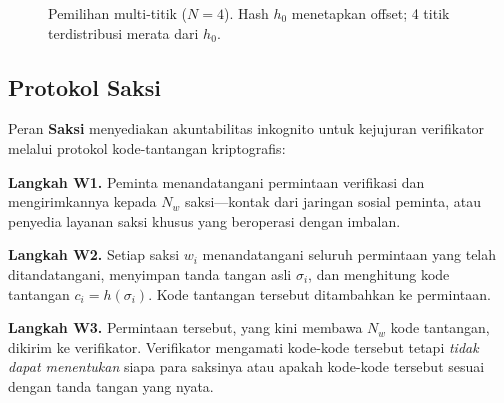 \documentclass[11pt,a4paper,twocolumn]{article}
\begin{document}
\begin{figure}[ht]
\centering
{}
\caption{Pemilihan multi-titik ($N{=}4$). Hash $h_0$ menetapkan offset; 4 titik terdistribusi merata dari $h_0$.}
\label{fig:multipoint}
\end{figure}

\subsection{Protokol Saksi}

Peran \textbf{Saksi} menyediakan akuntabilitas inkognito untuk kejujuran verifikator melalui protokol kode-tantangan kriptografis:

\textbf{Langkah W1.} Peminta menandatangani permintaan verifikasi dan mengirimkannya kepada $N_w$ saksi---kontak dari jaringan sosial peminta, atau penyedia layanan saksi khusus yang beroperasi dengan imbalan.

\textbf{Langkah W2.} Setiap saksi $w_i$ menandatangani seluruh permintaan yang telah ditandatangani, menyimpan tanda tangan asli $\sigma_i$, dan menghitung kode tantangan $c_i = h(\sigma_i)$. Kode tantangan tersebut ditambahkan ke permintaan.

\textbf{Langkah W3.} Permintaan tersebut, yang kini membawa $N_w$ kode tantangan, dikirim ke verifikator. Verifikator mengamati kode-kode tersebut tetapi \emph{tidak dapat menentukan} siapa para saksinya atau apakah kode-kode tersebut sesuai dengan tanda tangan yang nyata.
\end{document}
